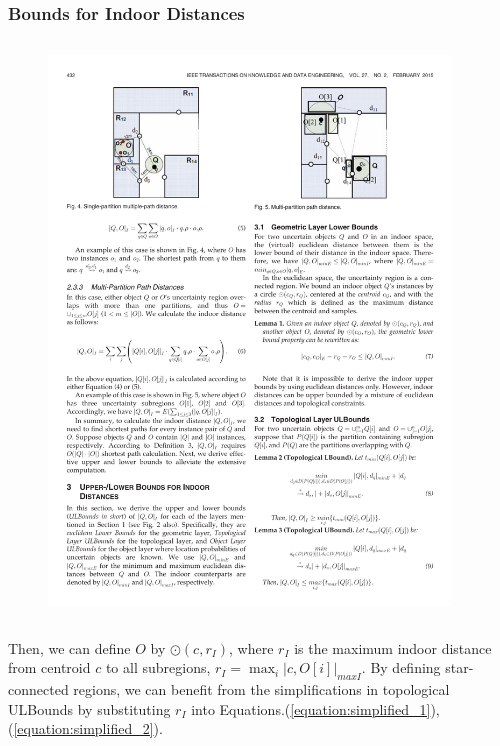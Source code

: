 
\begin{frame}
\frametitle{Bounds for Indoor Distances}

\begin{columns}[c]

  \begin{figure}[tb]
    \includegraphics[width=\columnwidth]{figures/2-7/2-7-3.pdf}
  \end{figure}

  \begin{example}
  \end{example}

\end{columns}

\vspace{10pt}

\textrm{Then, we can define $O$ by $\odot(c, r_I)$, where $r_I$ is the maximum indoor distance from centroid $c$ to all subregions, $r_I = \max_{i} |c, O[i]|_{maxI}$. By defining star-connected regions, we can benefit from the simplifications in topological ULBounds by substituting $r_I$ into Equations.(\ref{equation:simplified_1}), (\ref{equation:simplified_2}).}

\end{frame}

